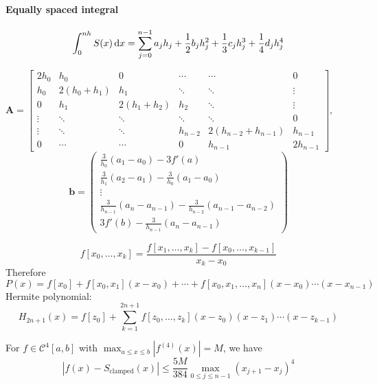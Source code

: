 \paragraph{Equally spaced integral}
\[
\int_0^{nh}S(x)\,\mathrm{d} x
=\sum_{j=0}^{n-1} a_jh_j+\frac{1}{2}b_jh_j^2+\frac{1}{3}c_jh_j^3+\frac{1}{4}d_jh_j^4
\]
\begin{definition}[Clamped Spline Interpolant: Linear system $\bm{Ax}=\bm b$]
\[
\bm A=\begin{bmatrix}
2h_0&h_0&0&\cdots&\cdots&0\\
h_0&2(h_0+h_1)&h_1&\ddots&\ddots&\vdots\\
0&h_1&2(h_1+h_2)&h_2&\ddots&\vdots\\
\vdots&\ddots&\ddots&\ddots&\ddots&0\\
\vdots&\ddots&\ddots&h_{n-2}&2(h_{n-2}+h_{n-1})&h_{n-1}\\
0&\cdots&\cdots&0&h_{n-1}&2h_{n-1}
\end{bmatrix},\qquad
\]
\[
\bm b=\begin{pmatrix}
\frac{3}{h_0}(a_1-a_0)-3f'(a)
\\\frac{3}{h_1}(a_2-a_1)-\frac{3}{h_0}(a_1-a_0)\\
\vdots\\
\frac{3}{h_{n-1}}(a_{n}-a_{n-1})-\frac{3}{h_{n-2}}(a_{n-1}-a_{n-2})\\
3f'(b)-\frac{3}{h_{n-1}}(a_n-a_{n-1})
\end{pmatrix}
\]
\end{definition}

\begin{definition}
\[
f[x_0,\dots,x_k]=\frac{f[x_1,\dots,x_k]-f[x_0,\dots,x_{k-1}]}{x_k-x_0}
\]
Therefore
\[
P(x)=f[x_0]+f[x_0,x_1](x-x_0)+\cdots+f[x_0,x_1,\dots,x_n](x-x_0)\cdots(x-x_{n-1})
\]
Hermite polynomial:
\[
H_{2n+1}(x)=f[z_0]+\sum_{k=1}^{2n+1}f[z_0,\dots,z_k](x-z_0)(x-z_1)\cdots(x-z_{k-1})
\]
\end{definition}

\begin{theorem}
For $f\in\mathcal{C}^4[a,b]$ with $\max_{a\le x\le b}|f^{(4)}(x)|=M$, we have
\[
|f(x)-S_{\text{clamped}}(x)|\le\frac{5M}{384}\max_{0\le j\le n-1}(x_{j+1}-x_j)^4
\]
\end{theorem}





